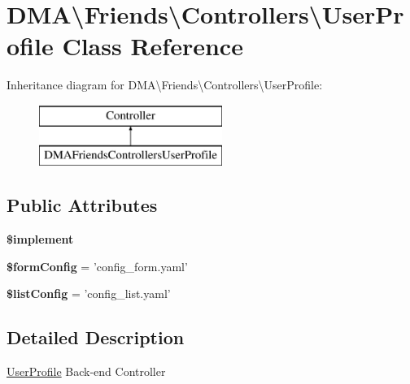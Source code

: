 \hypertarget{classDMA_1_1Friends_1_1Controllers_1_1UserProfile}{\section{D\+M\+A\textbackslash{}Friends\textbackslash{}Controllers\textbackslash{}User\+Profile Class Reference}
\label{classDMA_1_1Friends_1_1Controllers_1_1UserProfile}
}
Inheritance diagram for D\+M\+A\textbackslash{}Friends\textbackslash{}Controllers\textbackslash{}User\+Profile\+:\begin{figure}[H]
\begin{center}
\leavevmode
\includegraphics[height=2.000000cm]{d6/dc9/classDMA_1_1Friends_1_1Controllers_1_1UserProfile}
\end{center}
\end{figure}
\subsection*{Public Attributes}
\begin{DoxyCompactItemize}
\item 
{\bfseries \$implement}
\item 
\hypertarget{classDMA_1_1Friends_1_1Controllers_1_1UserProfile_a681527d2fc9f3dfe1c4f9687df18cb28}{{\bfseries \$form\+Config} = 'config\+\_\+form.\+yaml'}\label{classDMA_1_1Friends_1_1Controllers_1_1UserProfile_a681527d2fc9f3dfe1c4f9687df18cb28}

\item 
\hypertarget{classDMA_1_1Friends_1_1Controllers_1_1UserProfile_a7fcbc906cb7bbbec51f2cfdaacba0bf7}{{\bfseries \$list\+Config} = 'config\+\_\+list.\+yaml'}\label{classDMA_1_1Friends_1_1Controllers_1_1UserProfile_a7fcbc906cb7bbbec51f2cfdaacba0bf7}

\end{DoxyCompactItemize}


\subsection{Detailed Description}
\hyperlink{classDMA_1_1Friends_1_1Controllers_1_1UserProfile}{User\+Profile} Back-\/end Controller 

